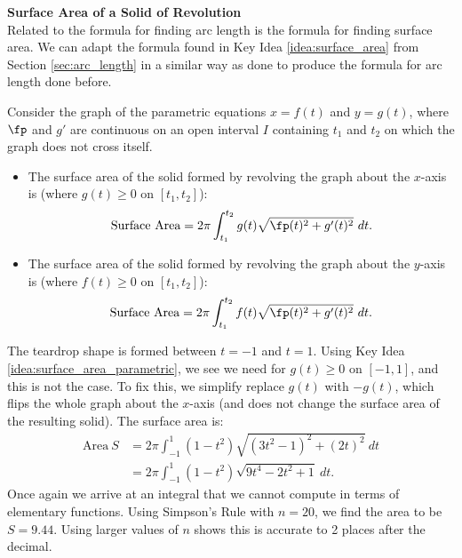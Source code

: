 \noindent\textbf{\large Surface Area of a Solid of Revolution}\\

Related to the formula for finding arc length is the formula for finding surface area. We can adapt the formula found in Key Idea \ref{idea:surface_area} from Section \ref{sec:arc_length} in a similar way as done to produce the formula for arc length done before.

{Consider the graph of the parametric equations $x=f(t)$ and $y=g(t)$, where $\fp$ and $g'$ are continuous on an open interval $I$ containing $t_1$ and $t_2$ on which the graph does not cross itself.
\begin{itemize}
	\item	The surface area of the solid formed by revolving the graph about the $x$-axis is (where $g(t)\geq 0$ on $[t_1,t_2]$):
	$$\text{Surface Area} = 2\pi\int_{t_1}^{t_2} g(t)\sqrt{\fp(t)^2+g'(t)^2}\ dt.$$
	
	\item	The surface area of the solid formed by revolving the graph about the $y$-axis is (where $f(t)\geq 0$ on $[t_1,t_2]$):
	$$\text{Surface Area} = 2\pi\int_{t_1}^{t_2} f(t)\sqrt{\fp(t)^2+g'(t)^2}\ dt.$$
	\end{itemize}
}


{The teardrop shape is formed between $t=-1$ and $t=1$. Using Key Idea \ref{idea:surface_area_parametric}, we see we need for $g(t)\geq 0$ on $[-1,1]$, and this is not the case. To fix this, we simplify replace $g(t)$ with $-g(t)$, which flips the whole graph about the $x$-axis (and does not change the surface area of the resulting solid). The surface area is: 
\begin{align*}
\text{Area}\ S &= 2\pi\int_{-1}^1 (1-t^2)\sqrt{(3t^2-1)^2+(2t)^2}\ dt\\
		&=	2\pi\int_{-1}^1 (1-t^2)\sqrt{9t^4-2t^2+1} \ dt.
		\end{align*}
Once again we arrive at an integral that we cannot compute in terms of elementary functions. Using Simpson's Rule with $n=20$, we find the area to be $S=9.44$. Using larger values of $n$ shows this is accurate to 2 places after the decimal.
}\\

